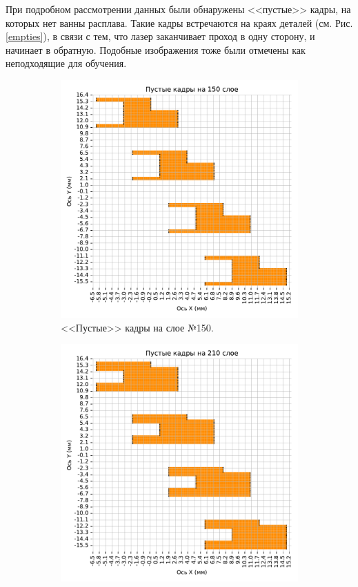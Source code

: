 \documentclass{article}
\begin{document}
    При подробном рассмотрении данных были обнаружены <<пустые>> кадры, на которых нет ванны расплава. Такие кадры встречаются на краях деталей (см. Рис. \ref{empties}), в связи с тем, что лазер заканчивает проход в одну сторону, и начинает в обратную. Подобные изображения тоже были отмечены как неподходящие для обучения.

    \begin{figure}[H]
        \center
        \begin{subfigure}{.47\textwidth}
            \centering
            \includegraphics[scale=.55]{150_empties.pdf}
            \caption{<<Пустые>> кадры на слое №150.}
        \end{subfigure}
        \hfill
        \begin{subfigure}{.47\textwidth}
            \centering
            \includegraphics[scale=.55]{210_empties.pdf}

\end{subfigure}
\end{figure}
\end{document}
